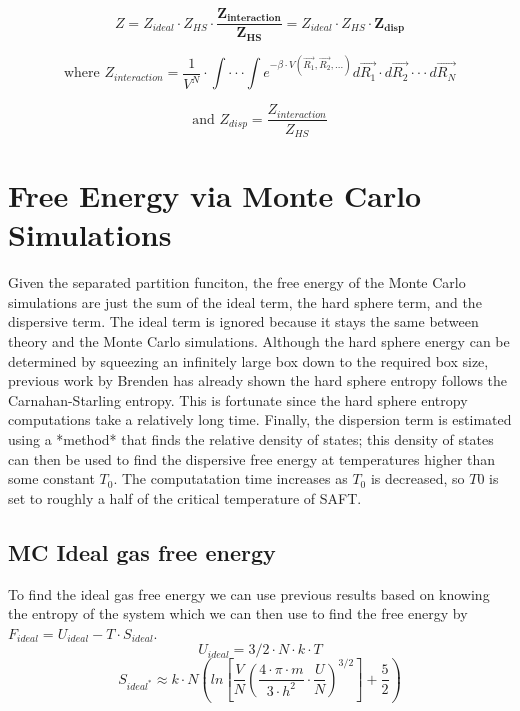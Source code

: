 \begin{equation}\label{eq:disp1}
Z=Z_{ideal}\cdot Z_{HS}\cdot \boldsymbol{\frac{Z_{interaction}}{Z_{HS}}}=Z_{ideal}\cdot Z_{HS}\cdot \boldsymbol{Z_{disp}}
\end{equation}

\begin{equation}\label{eq:disp1}
\text{where }Z_{interaction}=\frac{1}{V^N}\cdot \int\cdot\cdot\cdot\int e^{-\beta\cdot V(\vec{R_1},\vec{R_2},...)}d\vec{R_1}\cdot d\vec{R_2}\cdot\cdot\cdot d\vec{R_N}
\end{equation}

\begin{equation}\label{eq:disp1}
\text{and }Z_{disp}= \frac{Z_{interaction}}{Z_{HS}}
\end{equation}
\section{Free Energy via Monte Carlo Simulations}
Given the separated partition funciton, the free energy of the Monte Carlo simulations are just the sum of the ideal term, the hard sphere term, and the dispersive term. The ideal term is ignored because it stays the same between theory and the Monte Carlo simulations. Although the hard sphere energy can be determined by squeezing an infinitely large box down to the required box size, previous work by Brenden has already shown the hard sphere entropy follows the Carnahan-Starling entropy. This is fortunate since the hard sphere entropy computations take a relatively long time. Finally, the dispersion term is estimated using a *method* that finds the relative density of states; this density of states can then be used to find the dispersive free energy at temperatures higher than some constant $T_0$. The computatation time increases as $T_0$ is decreased, so $T0$ is set to roughly a half of the critical temperature of SAFT.
\subsection{MC Ideal gas free energy}
To find the ideal gas free energy we can use previous results based on knowing the entropy of the system which we can then use to find the free energy by $F_{ideal}=U_{ideal}-T\cdot S_{ideal}$.
\begin{equation}\label{eq:idealInternalEnergy}
U_{ideal}=3/2\cdot N\cdot k\cdot T
\end{equation}
\begin{equation}\label{eq:sackurTetrodeApprox}
S_{ideal^*}\approx k\cdot N \left ( ln\left [ \frac{V}{N}\left ( \frac{4\cdot \pi\cdot m}{3\cdot h^2}\cdot \frac{U}{N} \right)^{3/2} \right]+\frac{5}{2}\right )
\end{equation}



